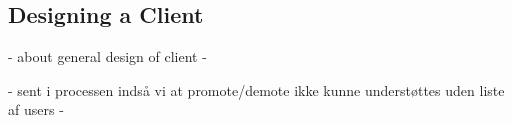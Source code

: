 \subsection{Designing a Client}

- about general design of client -

- sent i processen indså vi at promote/demote ikke kunne understøttes uden liste af users -

